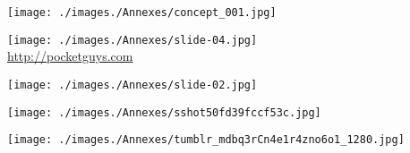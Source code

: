 \begin{minipage}{.49\textwidth}
\texttt{[image: ./images./Annexes/concept\_001.jpg]}
\\[-1mm]
\end{minipage}
\hspace{.02\textwidth}
\begin{minipage}{.49\textwidth}
\texttt{[image: ./images./Annexes/slide-04.jpg]}
\\[-1mm]
\url{http://pocketguys.com}
\end{minipage}

\begin{minipage}{\textwidth}
	\begin{minipage}[c]{.49\textwidth}
	\texttt{[image: ./images./Annexes/slide-02.jpg]}
	\\[-1mm]
	
	\vspace{2mm}
	
	\texttt{[image: ./images./Annexes/sshot50fd39fccf53c.jpg]}
	\\[-1mm]
	\end{minipage}
	\hspace{.02\textwidth}
	\begin{minipage}[c]{.49\textwidth}
	\texttt{[image: ./images./Annexes/tumblr\_mdbq3rCn4e1r4zno6o1\_1280.jpg]}
	\\[-1mm]
	\end{minipage}

\end{minipage}



